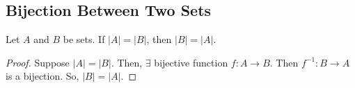 \subsection{Bijection Between Two Sets}
\label{sub_sec:bijection_between_two_sets}

\begin{theorem}
  Let $A$ and $B$ be sets. If $\vert A \vert = \vert B \vert$, then $\vert B
  \vert = \vert A \vert$.
\end{theorem}
\begin{proof}
  Suppose $\vert A \vert = \vert B \vert$. Then, $\exists$ bijective function
  $f : A \to B$. Then $f^{-1} : B \to A$ is a bijection. So, $\vert B \vert =
  \vert A \vert$.
\end{proof}

